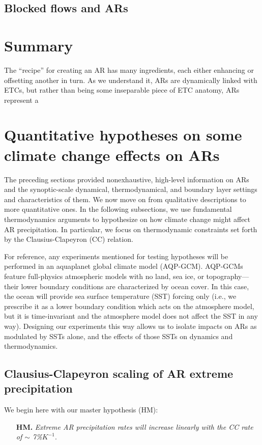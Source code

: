 \documentclass[letterpaper,12pt]{article}
\begin{document}
\subsection{Blocked flows and ARs}

\section{Summary} 

The ``recipe'' for creating an AR has many ingredients, each either enhancing or offsetting another in turn. As we understand it, ARs are dynamically linked with ETCs, but rather than being some inseparable piece of ETC anatomy, ARs represent a 

\section{Quantitative hypotheses on some climate change effects on ARs}

The preceding sections provided nonexhaustive, high-level information on ARs and the synoptic-scale dynamical, thermodynamical, and boundary layer settings and characteristics of them. We now move on from qualitative descriptions to more quantitative ones. In the following subsections, we use fundamental thermodynamics arguments to hypothesize on how climate change might affect AR precipitation. In particular, we focus on thermodynamic constraints set forth by the Clausius-Clapeyron (CC) relation. 

For reference, any experiments mentioned for testing hypotheses will be performed in an aquaplanet global climate model (AQP-GCM). AQP-GCMs feature full-physics atmospheric models with no land, sea ice, or topography---their lower boundary conditions are characterized by ocean cover. In this case, the ocean will provide sea surface temperature (SST) forcing only (i.e., we prescribe it as a lower boundary condition which acts on the atmosphere model, but it is time-invariant and the atmosphere model does not affect the SST in any way). Designing our experiments this way allows us to isolate impacts on ARs as modulated by SSTs alone, and the effects of those SSTs on dynamics and thermodynamics. 

\subsection{Clausius-Clapeyron scaling of AR extreme precipitation} 

We begin here with our master hypothesis (HM): 
\begin{itemize}
    \item[\textbf{HM.}] \textit{Extreme AR precipitation rates will increase linearly with the CC rate of $\sim$ 7\%$K^{-1}$}.
\end{itemize}
\end{document}
